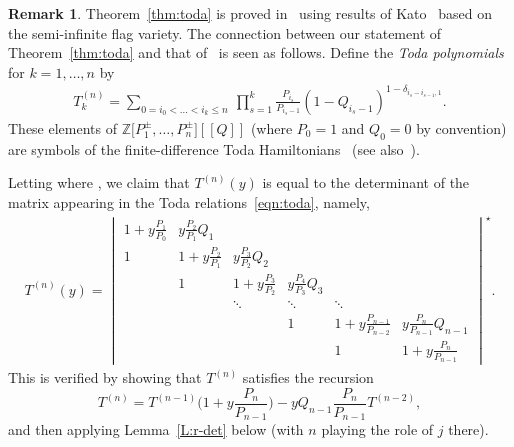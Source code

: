 \documentclass[11pt]{article}
\numberwithin{equation}{section}
\numberwithin{equation}{section}
\theoremstyle{definition}
\newtheorem{Remark}[Theorem]{Remark}
\newcommand{\Z}{{\mathbb Z}}
\begin{document}
\begin{Remark} \label{rmk:mns}
 Theorem~\ref{thm:toda} is proved in~\cite{maeno.naito.sagaki:QKideal} using results of Kato~\cite{kato:loop} based on the semi-infinite
 flag variety.
 		The connection between our statement of Theorem~\ref{thm:toda} and that of~\cite{maeno.naito.sagaki:QKideal} is seen as follows. Define the \textit{Toda polynomials}  for $k=1,\dots,n$ by
		\begin{align*}
		T^{(n)}_k = \sum_{0= i_0<\dots<i_k\leq n}\ \prod_{s=1}^{k}\frac{P_{i_s}}{P_{i_{s}-1}}\left(1-Q_{i_s-1}\right)^{1-\delta_{i_s-i_{s-1},1}}.
		\end{align*}
		These elements of $\Z\bigl[P_1^{\pm},\dots,P_{n}^{\pm}\bigr][\![Q]\!]$ (where $P_0=1$ and $Q_0=0$ by convention) are symbols of the finite-difference Toda Hamiltonians~\cite{etingof} (see also~\cite{act:2017,gloI,givental_lee,koroteev}).
		
		Letting  where , we claim that $T^{(n)}(y)$ is equal to the determinant of the matrix appearing in the Toda relations~\eqref{eqn:toda}, namely,
		\begin{align*}
 T^{(n)}(y)=\begin{vmatrix}
 1+y\frac{P_1}{P_0} & y\frac{P_2}{P_1}Q_1 & & & & \\[0.9mm]
 1 & 1+y\frac{P_2}{P_1} & y\frac{P_3}{P_2}Q_2 & & & \\[0.9mm]
 & 1 & 1+y\frac{P_3}{P_2} & y\frac{P_{4}}{P_{3}}Q_3 & & \\
 & & \ddots & \ddots & \ddots & \\
& & & 1 & 1+y\frac{P_{n-1}}{P_{n-2}} & y\frac{P_n}{P_{n-1}}Q_{n-1}\\[1mm]
& & & & 1 & 1+y\frac{P_n}{P_{n-1}}
\end{vmatrix}^\star.
		\end{align*}
		This is verified by showing that $T^{(n)}$ satisfies the recursion
		\begin{equation*}%
T^{(n)}= T^{(n-1)} \biggl(1+ y \frac{P_n}{P_{n-1}}\biggr) - y Q_{n-1} \frac{P_n}{P_{n-1}} T^{(n-2)} ,
		\end{equation*}
		and then applying Lemma~\ref{L:r-det} below (with $n$ playing the role of $j$ there).
		\end{Remark}
\end{document}
